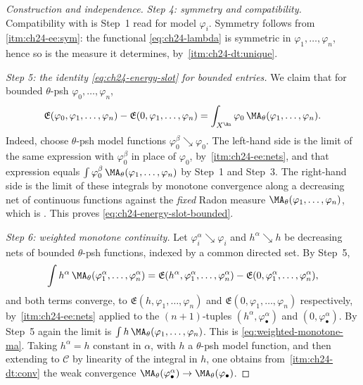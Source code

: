\begin{proof}[Construction and independence]
\emph{Step 4: symmetry and compatibility.}  Compatibility with
 is Step~1 read for model \(\varphi_i\).
Symmetry follows from
\,\cref{itm:ch24-ee:sym}: the functional
\eqref{eq:ch24-lambda} is symmetric in \(\varphi_1,\ldots,\varphi_n\), hence
so is the measure it determines, by
\,\cref{itm:ch24-dt:unique}.

\emph{Step 5: the identity \eqref{eq:ch24-energy-slot} for bounded
entries.}  We claim that for bounded \(\theta\)-psh
\(\varphi_0,\ldots,\varphi_n\),
\begin{equation}
\label{eq:ch24-energy-slot-bounded}
 \mathfrak E(\varphi_0,\varphi_1,\ldots,\varphi_n)
 -\mathfrak E(0,\varphi_1,\ldots,\varphi_n)
 =\int_{X^{\An}}\varphi_0\,\MA_\theta(\varphi_1,\ldots,\varphi_n).
\end{equation}
Indeed, choose \(\theta\)-psh model functions
\(\varphi_0^\beta\searrow\varphi_0\).  The left-hand side is the limit of the
same expression with \(\varphi_0^\beta\) in place of \(\varphi_0\), by
\,\cref{itm:ch24-ee:nets}, and that
expression equals \(\int\varphi_0^\beta\,
\MA_\theta(\varphi_1,\ldots,\varphi_n)\) by Step~1 and Step~3.  The
right-hand side is the limit of these integrals by monotone convergence
along a decreasing net of continuous functions against the \emph{fixed}
Radon measure \(\MA_\theta(\varphi_1,\ldots,\varphi_n)\), which is
.  This proves
\eqref{eq:ch24-energy-slot-bounded}.

\emph{Step 6: weighted monotone continuity.}  Let
\(\varphi_i^\alpha\searrow\varphi_i\) and \(h^\alpha\searrow h\) be
decreasing nets of bounded \(\theta\)-psh functions, indexed by a common
directed set.  By Step~5,
\[
 \int h^\alpha\,\MA_\theta(\varphi^\alpha_1,\ldots,\varphi^\alpha_n)
 =\mathfrak E(h^\alpha,\varphi^\alpha_1,\ldots,\varphi^\alpha_n)
  -\mathfrak E(0,\varphi^\alpha_1,\ldots,\varphi^\alpha_n),
\]
and both terms converge, to
\(\mathfrak E(h,\varphi_1,\ldots,\varphi_n)\) and
\(\mathfrak E(0,\varphi_1,\ldots,\varphi_n)\) respectively, by
\,\cref{itm:ch24-ee:nets} applied to the
\((n+1)\)-tuples \((h^\alpha,\varphi^\alpha_\bullet)\) and
\((0,\varphi^\alpha_\bullet)\).  By Step~5 again the limit is
\(\int h\,\MA_\theta(\varphi_1,\ldots,\varphi_n)\).  This is
\eqref{eq:weighted-monotone-ma}.  Taking \(h^\alpha=h\) constant in
\(\alpha\), with \(h\) a \(\theta\)-psh model function, and then extending to
\(\mathcal C\) by linearity of the integral in \(h\), one obtains from
\,\cref{itm:ch24-dt:conv} the weak convergence
\(\MA_\theta(\varphi^\alpha_\bullet)\to\MA_\theta(\varphi_\bullet)\).


\end{proof}

